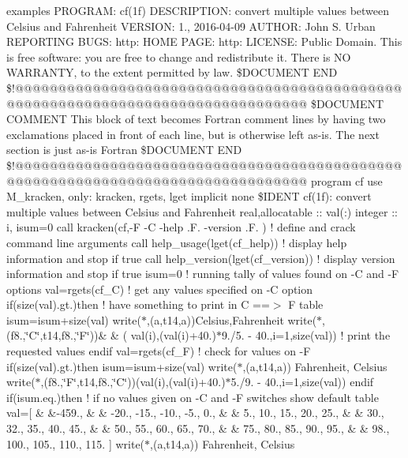 \begin{DoxyCompactItemize}
examples P\+R\+O\+G\+R\+A\+M\+: cf(1f) D\+E\+S\+C\+R\+I\+P\+T\+I\+O\+N\+: convert multiple values between Celsius and Fahrenheit V\+E\+R\+S\+I\+O\+N\+: 1., 2016-\/04-\/09 A\+U\+T\+H\+O\+R\+: John S. Urban R\+E\+P\+O\+R\+T\+I\+N\+G B\+U\+G\+S\+: http\+: H\+O\+M\+E P\+A\+G\+E\+: http\+: L\+I\+C\+E\+N\+S\+E\+: Public Domain. This is free software\+: you are free to change and redistribute it. There is N\+O W\+A\+R\+R\+A\+N\+T\+Y, to the extent permitted by law. \$\+D\+O\+C\+U\+M\+E\+N\+T E\+N\+D \$!@@@@@@@@@@@@@@@@@@@@@@@@@@@@@@@@@@@@@@@@@@@@@@@@@@@@@@@@@@@@@@@@@@@@@@@@@@@@@@@@ \$\+D\+O\+C\+U\+M\+E\+N\+T C\+O\+M\+M\+E\+N\+T This block of text becomes Fortran comment lines by having two exclamations placed in front of each line, but is otherwise left as-\/is. The next section is just as-\/is Fortran \$\+D\+O\+C\+U\+M\+E\+N\+T E\+N\+D \$!@@@@@@@@@@@@@@@@@@@@@@@@@@@@@@@@@@@@@@@@@@@@@@@@@@@@@@@@@@@@@@@@@@@@@@@@@@@@@@@@ program cf use M\+\_\+kracken, only\+: kracken, rgets, lget implicit none \$\+I\+D\+E\+N\+T cf(1f)\+: convert multiple values between Celsius and Fahrenheit real,allocatable \+:: val(\+:) integer \+:: i, isum=0 call kracken(\textquotesingle{}cf\textquotesingle{},\textquotesingle{}-\/\+F -\/\+C -\/help .\+F. -\/version .\+F.\textquotesingle{} ) ! define and crack command line arguments call help\+\_\+usage(lget(\textquotesingle{}cf\+\_\+help\textquotesingle{})) ! display help information and stop if true call help\+\_\+version(lget(\textquotesingle{}cf\+\_\+version\textquotesingle{})) ! display version information and stop if true isum=0 ! running tally of values found on -\/\+C and -\/\+F options val=rgets(\textquotesingle{}cf\+\_\+\+C\textquotesingle{}) ! get any values specified on -\/\+C option if(size(val).\+gt.)then ! have something to print in C ==$>$ F table isum=isum+size(val) write($\ast$,\textquotesingle{}(a,t14,a)\textquotesingle{})\textquotesingle{}\+Celsius\textquotesingle{},\textquotesingle{}\+Fahrenheit\textquotesingle{} write($\ast$,\textquotesingle{}(f8.,\char`\"{}\+C\char`\"{},t14,f8.,\char`\"{}\+F\char`\"{})\textquotesingle{})\& \& ( val(i),(val(i)+40.)$\ast$9./5. -\/ 40.,i=1,size(val)) ! print the requested values endif val=rgets(\textquotesingle{}cf\+\_\+\+F\textquotesingle{}) ! check for values on -\/\+F if(size(val).\+gt.)then isum=isum+size(val) write($\ast$,\textquotesingle{}(a,t14,a)\textquotesingle{}) \textquotesingle{}\+Fahrenheit\textquotesingle{}, \textquotesingle{}\+Celsius\textquotesingle{} write($\ast$,\textquotesingle{}(f8.,\char`\"{}\+F\char`\"{},t14,f8.,\char`\"{}\+C\char`\"{})\textquotesingle{})(val(i),(val(i)+40.)$\ast$5./9. -\/ 40.,i=1,size(val)) endif if(isum.\+eq.)then ! if no values given on -\/\+C and -\/\+F switches show default table val=\mbox{[} \& \&-\/459., \& \& -\/20., -\/15., -\/10., -\/5., 0., \& \& 5., 10., 15., 20., 25., \& \& 30., 32., 35., 40., 45., \& \& 50., 55., 60., 65., 70., \& \& 75., 80., 85., 90., 95., \& \& 98., 100., 105., 110., 115. \mbox{]} write($\ast$,\textquotesingle{}(a,t14,a)\textquotesingle{}) \textquotesingle{}\+Fahrenheit\textquotesingle{}, \textquotesingle{}\+Celsius\textquotesingle{} 
\end{DoxyCompactItemize}
